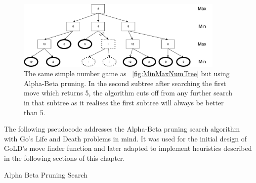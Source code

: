 \documentclass{l4proj}
\begin{document}
\begin{figure}[!ht]
\centering
\includegraphics[width=0.9\textwidth]{ABNumTree}

\caption{The same simple number game as ~\autoref{fig:MinMaxNumTree} but using Alpha-Beta pruning. In the second subtree after searching the first move which returns 5, the algorithm cuts off from any further search in that subtree as it realises the first subtree will always be better than 5. }
\label{fig:ABNumTree}
\end{figure}


The following pseudocode addresses the Alpha-Beta pruning search algorithm with Go's Life and Death problems in mind. It was used for the initial design of GoLD's move finder function and later adapted to implement heuristics described in the following sections of this chapter.

\begin{algorithm}[H]
\caption{Alpha Beta Pruning Search}\label{Alpha-Beta}
    \DontPrintSemicolon
\end{algorithm}
\end{document}
